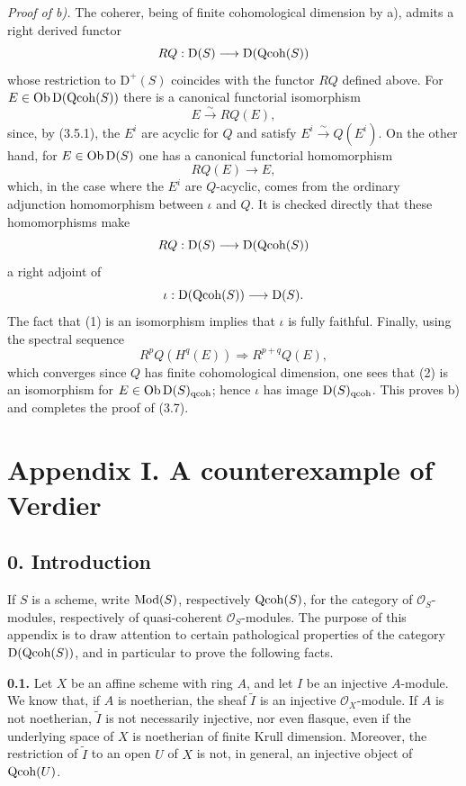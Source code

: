 \documentclass[11pt]{article}
\begin{document}
\emph{Proof of b).} The coherer, being of finite cohomological dimension by a), admits a right derived functor
\[
 RQ:\mathrm D(S)\longrightarrow\mathrm D(\operatorname{Qcoh}(S))
\]
whose restriction to $\mathrm D^+(S)$ coincides with the functor $RQ$ defined above. For $E\in\operatorname{Ob}\mathrm D(\operatorname{Qcoh}(S))$ there is a canonical functorial isomorphism
\begin{equation}\tag{1}
 E\xrightarrow{\sim}RQ(E),
\end{equation}
since, by (3.5.1), the $E^i$ are acyclic for $Q$ and satisfy $E^i\xrightarrow{\sim}Q(E^i)$. On the other hand, for $E\in\operatorname{Ob}\mathrm D(S)$ one has a canonical functorial homomorphism
\begin{equation}\tag{2}
 RQ(E)\longrightarrow E,
\end{equation}
which, in the case where the $E^i$ are $Q$-acyclic, comes from the ordinary adjunction homomorphism between $\iota$ and $Q$. It is checked directly that these homomorphisms make
\[
 RQ:\mathrm D(S)\longrightarrow\mathrm D(\operatorname{Qcoh}(S))
\]
a right adjoint of
\[
 \iota:\mathrm D(\operatorname{Qcoh}(S))\longrightarrow\mathrm D(S).
\]
The fact that (1) is an isomorphism implies that $\iota$ is fully faithful. Finally, using the spectral sequence
\[
 R^pQ(H^q(E))\Longrightarrow R^{p+q}Q(E),
\]
which converges since $Q$ has finite cohomological dimension, one sees that (2) is an isomorphism for $E\in\operatorname{Ob}\mathrm D(S)_{\mathrm{qcoh}}$; hence $\iota$ has image $\mathrm D(S)_{\mathrm{qcoh}}$. This proves b) and completes the proof of (3.7).

\section*{Appendix I. A counterexample of Verdier}

\subsection*{0. Introduction}
If $S$ is a scheme, write $\operatorname{Mod}(S)$, respectively $\operatorname{Qcoh}(S)$, for the category of $\mathcal O_S$-modules, respectively of quasi-coherent $\mathcal O_S$-modules. The purpose of this appendix is to draw attention to certain pathological properties of the category $\mathrm D(\operatorname{Qcoh}(S))$, and in particular to prove the following facts.

\textbf{0.1.} Let $X$ be an affine scheme with ring $A$, and let $I$ be an injective $A$-module. We know that, if $A$ is noetherian, the sheaf $\widetilde I$ is an injective $\mathcal O_X$-module. If $A$ is not noetherian, $\widetilde I$ is not necessarily injective, nor even flasque, even if the underlying space of $X$ is noetherian of finite Krull dimension. Moreover, the restriction of $\widetilde I$ to an open $U$ of $X$ is not, in general, an injective object of $\operatorname{Qcoh}(U)$.
\end{document}
